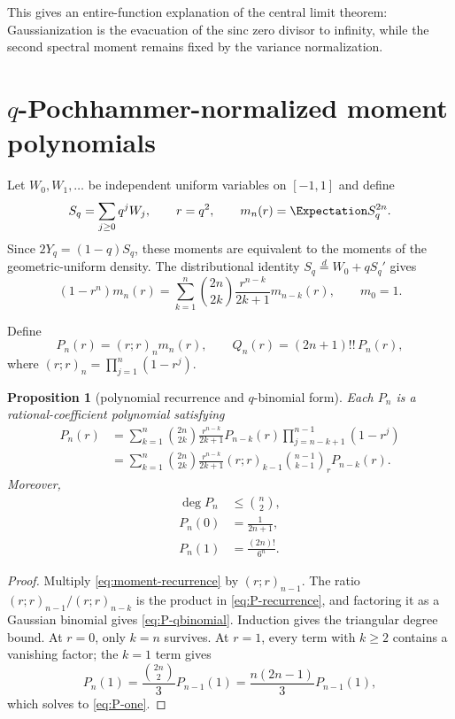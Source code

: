 \documentclass[11pt]{article}
\newtheorem{proposition}[theorem]{Proposition}
\theoremstyle{definition}
\theoremstyle{remark}
\begin{document}
This gives an entire-function explanation of the central limit theorem: Gaussianization is the evacuation of the sinc zero divisor to infinity, while the second spectral moment remains fixed by the variance normalization.

\section{$q$-Pochhammer-normalized moment polynomials}
\label{sec:moment-polynomials}

Let $W_0,W_1,\ldots$ be independent uniform variables on $[-1,1]$ and define
\begin{equation}\label{eq:Sqr}
 S_q=\sum_{j\ge0}q^jW_j,
 \qquad r=q^2,
 \qquad m_n(r)=\Expectation S_q^{2n}.
\end{equation}
Since $2Y_q=(1-q)S_q$, these moments are equivalent to the moments of the geometric-uniform density.  The distributional identity $S_q\overset d=W_0+qS_q'$ gives
\begin{equation}\label{eq:moment-recurrence}
 (1-r^n)m_n(r)=
 \sum_{k=1}^n\binom{2n}{2k}\frac{r^{n-k}}{2k+1}m_{n-k}(r),
 \qquad m_0=1.
\end{equation}

Define
\begin{equation}\label{eq:PQ-def}
 P_n(r)=(r;r)_n m_n(r),
 \qquad
 Q_n(r)=(2n+1)!!\,P_n(r),
\end{equation}
where $(r;r)_n=\prod_{j=1}^n(1-r^j)$.

\begin{proposition}[polynomial recurrence and $q$-binomial form]\label{prop:P-recurrence}
Each $P_n$ is a rational-coefficient polynomial satisfying
\begin{align}
 P_n(r)
 &=\sum_{k=1}^n\binom{2n}{2k}\frac{r^{n-k}}{2k+1}
 P_{n-k}(r)\prod_{j=n-k+1}^{n-1}(1-r^j)\label{eq:P-recurrence}\\
 &=\sum_{k=1}^n\binom{2n}{2k}\frac{r^{n-k}}{2k+1}
 (r;r)_{k-1}\binom{n-1}{k-1}_rP_{n-k}(r).
 \label{eq:P-qbinomial}
\end{align}
Moreover,
\begin{align}
 \deg P_n&\le\binom n2,\label{eq:P-degree-bound}\\
 P_n(0)&=\frac1{2n+1},\label{eq:P-zero}\\
 P_n(1)&=\frac{(2n)!}{6^n}.
 \label{eq:P-one}
\end{align}
\end{proposition}

\begin{proof}
Multiply \cref{eq:moment-recurrence} by $(r;r)_{n-1}$.  The ratio
$(r;r)_{n-1}/(r;r)_{n-k}$ is the product in \cref{eq:P-recurrence}, and factoring it as a Gaussian binomial gives \cref{eq:P-qbinomial}.  Induction gives the triangular degree bound.  At $r=0$, only $k=n$ survives.  At $r=1$, every term with $k\ge2$ contains a vanishing factor; the $k=1$ term gives
\[
 P_n(1)=\frac{\binom{2n}{2}}3P_{n-1}(1)
 =\frac{n(2n-1)}3P_{n-1}(1),
\]
which solves to \cref{eq:P-one}.
\end{proof}
\end{document}

